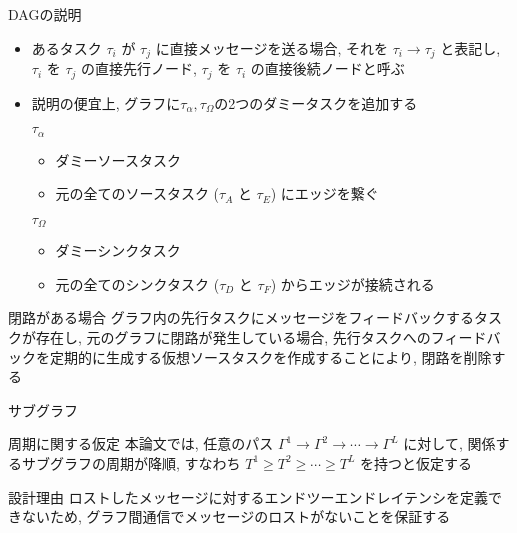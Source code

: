 \begin{frame}{DAGの説明}
    \begin{itemize}
        \item あるタスク $\tau_{i}$ が $\tau_{j}$ に直接メッセージを送る場合, それを $\tau_{i} \rightarrow \tau_{j}$ と表記し, $\tau_{i}$ を $\tau_{j}$ の直接先行ノード, $\tau_{j}$ を $\tau_{i}$ の直接後続ノードと呼ぶ
        \item 説明の便宜上, グラフに$\tau_\alpha, \tau_\Omega$の2つのダミータスクを追加する
              \begin{block}{$\tau_\alpha$}
                  \setlength{\linewidth}{0.98\columnwidth}
                  \begin{itemize}
                      \item ダミーソースタスク
                      \item 元の全てのソースタスク ($\tau_{A}$ と $\tau_{E}$) にエッジを繋ぐ
                  \end{itemize}
              \end{block}
              \begin{block}{$\tau_\Omega$}
                  \setlength{\linewidth}{0.98\columnwidth}
                  \begin{itemize}
                      \item ダミーシンクタスク
                      \item 元の全てのシンクタスク ($\tau_{D}$ と $\tau_{F}$) からエッジが接続される
                  \end{itemize}
              \end{block}
    \end{itemize}
\end{frame}

\begin{frame}{閉路がある場合}
    グラフ内の先行タスクにメッセージをフィードバックするタスクが存在し, 元のグラフに閉路が発生している場合, 先行タスクへのフィードバックを定期的に生成する仮想ソースタスクを作成することにより, 閉路を削除する
\end{frame}

\begin{frame}{サブグラフ}
\end{frame}

\begin{frame}{周期に関する仮定}
    本論文では, 任意のパス $\Gamma^{1} \rightarrow \Gamma^{2} \rightarrow \cdots \rightarrow \Gamma^{L}$ に対して, 関係するサブグラフの周期が降順, すなわち $T^{1} \geq T^{2} \geq \cdots \geq T^{L}$ を持つと仮定する
    \begin{block}{設計理由}
        ロストしたメッセージに対するエンドツーエンドレイテンシを定義できないため, グラフ間通信でメッセージのロストがないことを保証する
    \end{block}
\end{frame}

